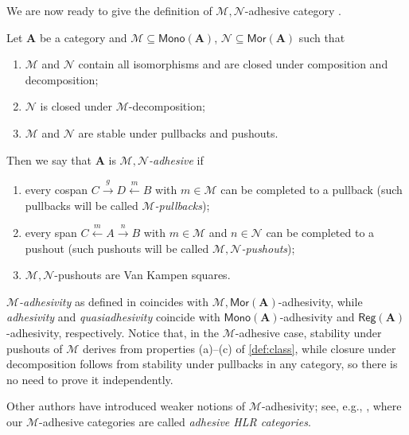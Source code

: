 \documentclass[runningheads,envcountsect]{lmcs}
\newcommand{\catname}[1]{\mathbf{#1}}
\newcommand{\arr}[1]{\mathsf{Mor}(\catname{#1})}
\newcommand{\mono}[1]{\mathsf{Mono}(\catname{#1})}
\newcommand{\reg}[1]{\mathsf{Reg}(\catname{#1})}
\theoremstyle{plain}
\theoremstyle{definition}
\begin{document}
We are now ready to give the definition of $\mathcal{M},\mathcal{N}$-adhesive category \cite{habel2012mathcal,peuser2016composition}.	
\begin{defi}\label{def:class}
	Let $\catname{A}$ be a category and $\mathcal{M}{\subseteq}\mono{A}$, $\mathcal{N}{\subseteq} \arr{A}$ such that
	\begin{enumerate}[label=(\roman*)]
		\item $\mathcal{M}$ and $\mathcal{N}$ contain all isomorphisms and are closed under composition and decomposition;
		\item $\mathcal{N}$ is closed under $\mathcal{M}$-decomposition;
		\item $\mathcal{M}$ and $\mathcal{N}$ are stable under pullbacks and pushouts.
	\end{enumerate}
Then  we say that $\catname{A}$ is \emph{$\mathcal{M}, \mathcal{N}$-adhesive} if
\begin{enumerate}[label=(\alph*)]
 	\item every cospan $C\xrightarrow{g}D\xleftarrow{m}B$ with $m\in \mathcal{M}$ can be completed to a pullback (such pullbacks will be called \emph{$\mathcal{M}$-pullbacks});
	\item every span $C\xleftarrow{m}A\xrightarrow{n}B$ with $m\in \mathcal{M}$ and $n\in \mathcal{N}$ can be completed to a pushout (such pushouts will be called \emph{$\mathcal{M}, \mathcal{N}$-pushouts}); 
	\item  $\mathcal{M}, \mathcal{N}$-pushouts are Van Kampen squares.
\end{enumerate}
\end{defi}

\begin{rem}\label{rem:salva}
 \emph{$\mathcal{M}$-adhesivity} as defined in \cite{azzi2019essence} coincides with $\mathcal{M},\arr{A}$-adhesivity, while 
 \emph{adhesivity} and \emph{quasiadhesivity} \cite{lack2005adhesive,garner2012axioms}  coincide with  $\mono{A}$-adhesivity and $\reg{A}$-adhesivity, respectively. Notice that, in the $\mathcal{M}$-adhesive case, stability under pushouts of $\mathcal{M}$ derives from properties (a)--(c) of \cref{def:class}, while closure under decomposition follows from stability under pullbacks in any category, so there is no need to prove it independently. 
 
Other authors have introduced weaker notions of $\mathcal{M}$-adhesivity; see, e.g.,  \cite{ehrig2006fundamentals,ehrig2004adhesive,sobocinski2020rule}, where our $\mathcal{M}$-adhesive categories are called \emph{adhesive HLR categories}.
\end{rem}
\end{document}
